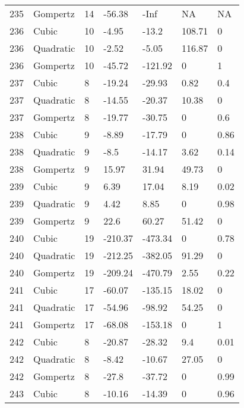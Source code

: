 \documentclass[11pt]{article}
\begin{document}
\begin{center}
\begin{longtable}{lllllll}
    235 & Gompertz  & 14              & -56.38  & -Inf    & NA      & NA   \\
    236 & Cubic     & 10              & -4.95   & -13.2   & 108.71  & 0    \\
    236 & Quadratic & 10              & -2.52   & -5.05   & 116.87  & 0    \\
    236 & Gompertz  & 10              & -45.72  & -121.92 & 0       & 1    \\
    237 & Cubic     & 8               & -19.24  & -29.93  & 0.82    & 0.4  \\
    237 & Quadratic & 8               & -14.55  & -20.37  & 10.38   & 0    \\
    237 & Gompertz  & 8               & -19.77  & -30.75  & 0       & 0.6  \\
    238 & Cubic     & 9               & -8.89   & -17.79  & 0       & 0.86 \\
    238 & Quadratic & 9               & -8.5    & -14.17  & 3.62    & 0.14 \\
    238 & Gompertz  & 9               & 15.97   & 31.94   & 49.73   & 0    \\
    239 & Cubic     & 9               & 6.39    & 17.04   & 8.19    & 0.02 \\
    239 & Quadratic & 9               & 4.42    & 8.85    & 0       & 0.98 \\
    239 & Gompertz  & 9               & 22.6    & 60.27   & 51.42   & 0    \\
    240 & Cubic     & 19              & -210.37 & -473.34 & 0       & 0.78 \\
    240 & Quadratic & 19              & -212.25 & -382.05 & 91.29   & 0    \\
    240 & Gompertz  & 19              & -209.24 & -470.79 & 2.55    & 0.22 \\
    241 & Cubic     & 17              & -60.07  & -135.15 & 18.02   & 0    \\
    241 & Quadratic & 17              & -54.96  & -98.92  & 54.25   & 0    \\
    241 & Gompertz  & 17              & -68.08  & -153.18 & 0       & 1    \\
    242 & Cubic     & 8               & -20.87  & -28.32  & 9.4     & 0.01 \\
    242 & Quadratic & 8               & -8.42   & -10.67  & 27.05   & 0    \\
    242 & Gompertz  & 8               & -27.8   & -37.72  & 0       & 0.99 \\
    243 & Cubic     & 8               & -10.16  & -14.39  & 0       & 0.96 \\

\end{longtable}
\end{center}
\end{document}
